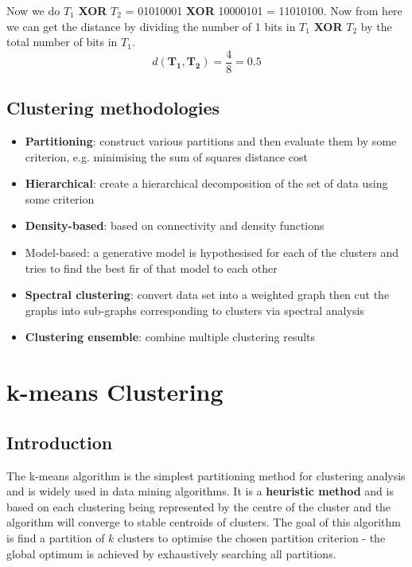 \documentclass[11pt,fleqn]{book} %
\begin{document}
\noindent
Now we do $T_1$ \textbf{XOR} $T_2$ = 01010001 \textbf{XOR} 10000101 = 11010100. Now from here we can get the distance by dividing the number of 1 bits in $T_1$ \textbf{XOR} $T_2$ by the total number of bits in $T_1$.
$$d(\mathbf{T_1}, \mathbf{T_2}) = \frac{4}{8} = 0.5$$

\section{Clustering methodologies}
\begin{itemize}
	\item \textbf{Partitioning}: construct various partitions and then evaluate them by some criterion, e.g. minimising the sum of squares distance cost
	\item \textbf{Hierarchical}: create a hierarchical decomposition of the set of data using some criterion
	\item \textbf{Density-based}: based on connectivity and density functions
	\item Model-based: a generative model is hypothesised for each of the clusters and tries to find the best fir of that model to each other
	\item \textbf{Spectral clustering}: convert data set into a weighted graph then cut the graphs into sub-graphs corresponding to clusters via spectral analysis
	\item \textbf{Clustering ensemble}: combine multiple clustering results
\end{itemize}



\chapter{k-means Clustering}

\section*{Introduction}
The k-means algorithm is the simplest partitioning method for clustering analysis and is widely used in data mining algorithms. It is a \textbf{heuristic method} and is based on each clustering being represented by the centre of the cluster and the algorithm will converge to stable centroids of clusters. The goal of this algorithm is find a partition of $k$ clusters to optimise the chosen partition criterion - the global optimum is achieved by exhaustively searching all partitions.
\end{document}

